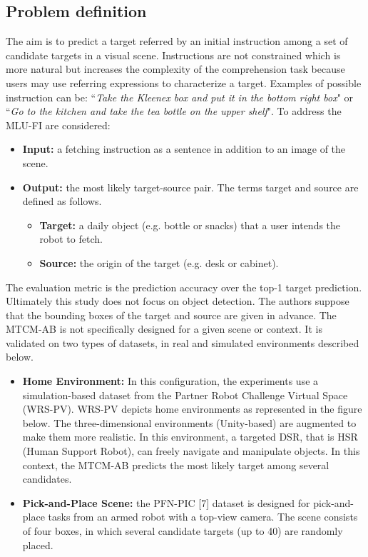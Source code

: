 \subsection{Problem definition}\label{header-n262}

The aim is to predict a target referred by an initial instruction among
a set of candidate targets in a visual scene. Instructions are not
constrained which is more natural but increases the complexity of the
comprehension task because users may use referring expressions to
characterize a target. Examples of possible instruction can be:
``\emph{Take the Kleenex box and put it in the bottom right box}" or
``\emph{Go to the kitchen and take the tea bottle on the upper shelf}".
To address the MLU-FI are considered:

\begin{itemize}
\item
  \textbf{Input:} a fetching instruction as a sentence in addition to an
  image of the scene. 
\item
  \textbf{Output:} the most likely target-source pair. The terms target
  and source are defined as follows.

  \begin{itemize}
  \item
    \textbf{Target:} a daily object (e.g. bottle or snacks) that a user
    intends the robot to fetch.
  \item
    \textbf{Source:} the origin of the target (e.g. desk or cabinet).
  \end{itemize}
\end{itemize}

The evaluation metric is the prediction accuracy over the top-1 target
prediction. Ultimately this study does not focus on object detection.
The authors suppose that the bounding boxes of the target and source are
given in advance. The MTCM-AB is not specifically designed for a given
scene or context. It is validated on two types of datasets, in real and
simulated environments described below.

\begin{itemize}
\item
  \textbf{Home Environment:} In this configuration, the experiments use
  a simulation-based dataset from the Partner Robot Challenge Virtual
  Space (WRS-PV). WRS-PV depicts home environments as represented in the
  figure below. The three-dimensional environments (Unity-based) are
  augmented to make them more realistic. In this environment, a targeted
  DSR, that is HSR (Human Support Robot), can freely navigate and
  manipulate objects. In this context, the MTCM-AB predicts the most
  likely target among several candidates.
\item
  \textbf{Pick-and-Place Scene:} the PFN-PIC {[}7{]} dataset is designed
  for pick-and-place tasks from an armed robot with a top-view camera.
  The scene consists of four boxes, in which several candidate targets
  (up to 40) are randomly placed.
\end{itemize}

